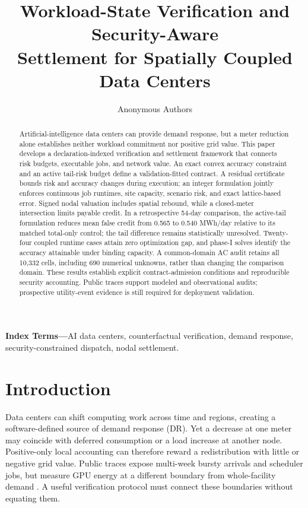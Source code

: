 \documentclass[10pt,journal]{IEEEtran}
\title{Workload-State Verification and Security-Aware\\
Settlement for Spatially Coupled Data Centers}
\author{Anonymous Authors}
\begin{document}
\maketitle

\begin{abstract}
Artificial-intelligence data centers can provide demand response, but a meter
reduction alone establishes neither workload commitment nor positive grid
value. This paper develops a declaration-indexed verification and settlement
framework that connects risk budgets, executable jobs, and network value.
An exact convex accuracy constraint and an active tail-risk budget define a
validation-fitted contract. A residual certificate bounds risk and accuracy
changes during execution; an integer formulation jointly enforces continuous
job runtimes, site capacity, scenario risk, and exact lattice-based error.
Signed nodal valuation includes spatial rebound, while a closed-meter
intersection limits payable credit. In a retrospective 54-day comparison,
the active-tail formulation reduces mean false credit from 0.565 to
0.540 MWh/day relative to its matched total-only control; the tail difference
remains statistically unresolved. Twenty-four coupled runtime cases attain
zero optimization gap, and phase-I solves identify the accuracy attainable
under binding capacity. A common-domain AC audit retains all 10,332 cells,
including 690 numerical unknowns, rather than changing the comparison domain.
These results establish explicit contract-admission conditions and reproducible
security accounting. Public traces support modeled and observational audits;
prospective utility-event evidence is still required for deployment validation.
\end{abstract}

\noindent\textbf{Index Terms---}AI data centers, counterfactual verification,
demand response, security-constrained dispatch, nodal settlement.

\section{Introduction}

Data centers can shift computing work across time and regions, creating a
software-defined source of demand response (DR). Yet a decrease at one meter
may coincide with deferred consumption or a load increase at another node.
Positive-only local accounting can therefore reward a redistribution with
little or negative grid value. Public traces expose multi-week bursty arrivals
and scheduler jobs, but measure GPU energy at a different boundary from
whole-facility demand \cite{wang2024burstgpt,samsi2021supercloud}. A useful
verification protocol must connect these boundaries without equating them.
\end{document}
